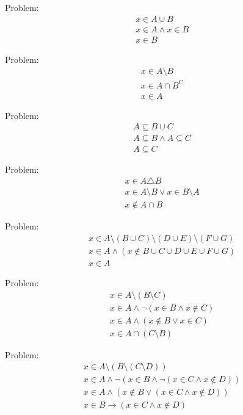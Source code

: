 \documentclass[12pt,letterpaper]{article}
\begin{document}
Problem:
\begin{align}
& x \in A \cup B
\\
& x \in A \wedge x \in B
\\
& x \in B
\end{align}

Problem:
\begin{align}
& x \in A \setminus B
\\
& x \in A \cap B ^C
\\
& x \in A
\end{align}

Problem:
\begin{align}
& A \subseteq B \cup C
\\
& A \subseteq B \wedge A \subseteq C
\\
& A \subseteq C
\end{align}

Problem:
\begin{align}
& x \in A \triangle B
\\
& x \in A \setminus B \vee x \in B \setminus A
\\
& x \notin A \cap B
\end{align}

Problem:
\begin{align}
& x \in A \setminus ( B \cup C ) \setminus ( D \cup E ) \setminus ( F \cup G )
\\
& x \in A \wedge (x \notin B \cup C \cup D \cup E \cup F \cup G )
\\
& x \in A
\end{align}

Problem:
\begin{align}
& x \in A \setminus ( B \setminus C )
\\
& x \in A \wedge \neg (x \in B \wedge x \notin C )
\\
& x \in A \wedge (x \notin B \vee x \in C )
\\
& x \in A \cap ( C \setminus B )
\end{align}

Problem:
\begin{align}
& x \in A \setminus ( B \setminus ( C \setminus D ))
\\
& x \in A \wedge \neg(x \in B \wedge\neg(x \in C \wedge x \notin D ))
\\
& x \in A \wedge (x \notin B \vee (x \in C \wedge x \notin D ))
\\
& x \in B \rightarrow (x \in C \wedge x \notin D )
\end{align}
\end{document}
